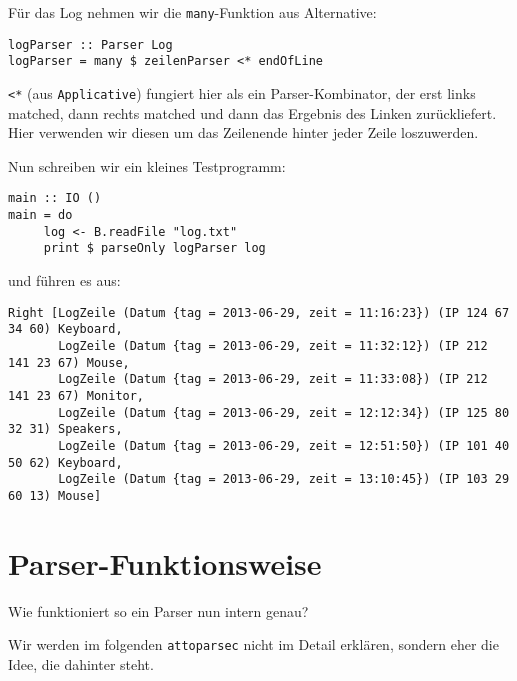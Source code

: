 \documentclass{beamer}
\begin{document}
\begin{frame}[fragile]
Für das Log nehmen wir die \texttt{many}-Funktion aus \glqq Alternative\grqq :
\bigskip

\begin{verbatim}
logParser :: Parser Log
logParser = many $ zeilenParser <* endOfLine
\end{verbatim}
\pause
\texttt{<*} (aus \texttt{Applicative}) fungiert hier als ein Parser-Kombinator, der erst links matched, dann rechts matched und dann das Ergebnis des Linken zurückliefert.\\
\pause
Hier verwenden wir diesen um das Zeilenende hinter jeder Zeile loszuwerden.
\end{frame}

\begin{frame}[fragile]
Nun schreiben wir ein kleines Testprogramm:
\begin{verbatim}
main :: IO ()
main = do
     log <- B.readFile "log.txt"
     print $ parseOnly logParser log
\end{verbatim}
und führen es aus:
\tiny
\begin{verbatim}
Right [LogZeile (Datum {tag = 2013-06-29, zeit = 11:16:23}) (IP 124 67 34 60) Keyboard,
       LogZeile (Datum {tag = 2013-06-29, zeit = 11:32:12}) (IP 212 141 23 67) Mouse,
       LogZeile (Datum {tag = 2013-06-29, zeit = 11:33:08}) (IP 212 141 23 67) Monitor,
       LogZeile (Datum {tag = 2013-06-29, zeit = 12:12:34}) (IP 125 80 32 31) Speakers,
       LogZeile (Datum {tag = 2013-06-29, zeit = 12:51:50}) (IP 101 40 50 62) Keyboard,
       LogZeile (Datum {tag = 2013-06-29, zeit = 13:10:45}) (IP 103 29 60 13) Mouse]
\end{verbatim}
\normalsize

\end{frame}

\section{Parser-Funktionsweise}
\begin{frame}[fragile]
Wie funktioniert so ein Parser nun intern genau?\bigskip

\pause
Wir werden im folgenden \texttt{attoparsec} nicht im Detail erklären, sondern eher die Idee, die dahinter steht.
\end{frame}
\end{document}
